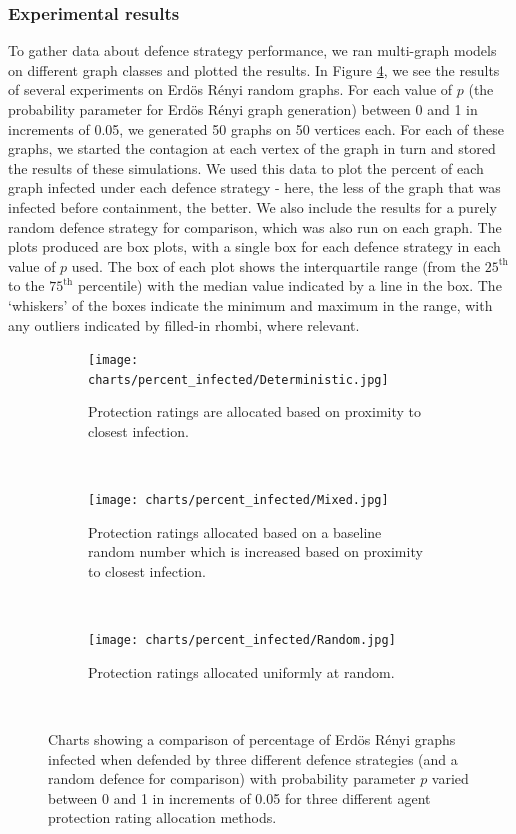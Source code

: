 \documentclass[../report.tex]{subfiles}
\begin{document}
\subsubsection{Experimental results}

To gather data about defence strategy performance, we ran multi-graph models on different graph classes and plotted the results. In Figure \ref{fig:plots}, we see the results of several experiments on Erd\"{o}s R\'{e}nyi random graphs. For each value of $p$ (the probability parameter for Erd\"{o}s R\'{e}nyi graph generation) between 0 and 1 in increments of 0.05, we generated 50 graphs on 50 vertices each. For each of these graphs, we started the contagion at each vertex of the graph in turn and stored the results of these simulations. We used this data to plot the percent of each graph infected under each defence strategy - here, the less of the graph that was infected before containment, the better. We also include the results for a purely random defence strategy for comparison, which was also run on each graph. The plots produced are box plots, with a single box for each defence strategy in each value of $p$ used. The box of each plot shows the interquartile range (from the $25^\text{th}$ to the $75^\text{th}$ percentile) with the median value indicated by a line in the box. The `whiskers' of the boxes indicate the minimum and maximum in the range, with any outliers indicated by filled-in rhombi, where relevant.

\begin{figure}[!ht] 
  \begin{centering}
    \begin{subfigure}{0.6\linewidth}
      \centering
	  \texttt{[image: charts/percent\_infected/Deterministic.jpg]}
	  \caption{Protection ratings are allocated based on proximity to closest infection.}
      \label{fig:det-result}
    \end{subfigure}\\
    \begin{subfigure}{0.6\linewidth}
      \centering
      \texttt{[image: charts/percent\_infected/Mixed.jpg]}
	  \caption{Protection ratings allocated based on a baseline random number which is increased based on proximity to closest infection.}
      \label{fig:mix-result}
    \end{subfigure}\\
    \begin{subfigure}{0.6\linewidth}
      \centering
      \texttt{[image: charts/percent\_infected/Random.jpg]}
	  \caption{Protection ratings allocated uniformly at random.}
      \label{fig:ran-result}
    \end{subfigure}\\
  \end{centering}
  \caption{Charts showing a comparison of percentage of Erd\"{o}s R\'{e}nyi graphs infected when defended by three different defence strategies (and a random defence for comparison) with probability parameter $p$ varied between 0 and 1 in increments of 0.05  for three different agent protection rating allocation methods.}
  \label{fig:plots}
\end{figure}
\end{document}
